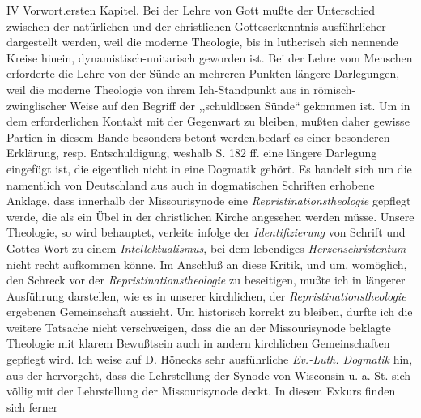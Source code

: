 IV \hfill Vorwort.\n\n\bigskip\n\nbeiden ersten Kapitel. Bei der Lehre von Gott mußte der Unterschied zwischen der natürlichen und der christlichen Gotteserkenntnis ausführlicher dargestellt werden, weil die moderne Theologie, bis in lutherisch sich nennende Kreise hinein, dynamistisch-unitarisch geworden ist. Bei der Lehre vom Menschen erforderte die Lehre von der Sünde an mehreren Punkten längere Darlegungen, weil die moderne Theologie von ihrem Ich-Standpunkt aus in römisch-zwinglischer Weise auf den Begriff der ,,schuldlosen Sünde`` gekommen ist. Um in dem erforderlichen Kontakt mit der Gegenwart zu bleiben, mußten daher gewisse Partien in diesem Bande besonders betont werden.\n\nDagegen bedarf es einer besonderen Erklärung, resp. Entschuldigung, weshalb S. 182 ff. eine längere Darlegung eingefügt ist, die eigentlich nicht in eine Dogmatik gehört. Es handelt sich um die namentlich von Deutschland aus auch in dogmatischen Schriften erhobene Anklage, dass innerhalb der Missourisynode eine \emph{Repristinationstheologie} gepflegt werde, die als ein Übel in der christlichen Kirche angesehen werden müsse. Unsere Theologie, so wird behauptet, verleite infolge der \emph{Identifizierung} von Schrift und Gottes Wort zu einem \emph{Intellektualismus}, bei dem lebendiges \emph{Herzenschristentum} nicht recht aufkommen könne. Im Anschluß an diese Kritik, und um, womöglich, den Schreck vor der \emph{Repristinationstheologie} zu beseitigen, mußte ich in längerer Ausführung darstellen, wie es in unserer kirchlichen, der \emph{Repristinationstheologie} ergebenen Gemeinschaft aussieht. Um historisch korrekt zu bleiben, durfte ich die weitere Tatsache nicht verschweigen, dass die an der Missourisynode beklagte Theologie mit klarem Bewußtsein auch in andern kirchlichen Gemeinschaften gepflegt wird. Ich weise auf D. Hönecks sehr ausführliche \emph{Ev.-Luth. Dogmatik} hin, aus der hervorgeht, dass die Lehrstellung der Synode von Wisconsin u. a. St. sich völlig mit der Lehrstellung der Missourisynode deckt. In diesem Exkurs finden sich ferner